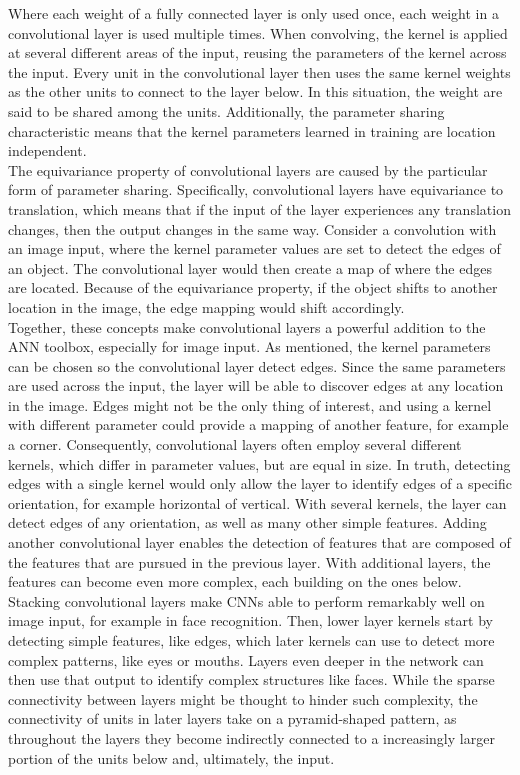 \noindent Where each weight of a fully connected layer is only used once, each weight in a convolutional layer is used multiple times. When convolving, the kernel is applied at several different areas of the input, reusing the parameters of the kernel across the input. Every unit in the convolutional layer then uses the same kernel weights as the other units to connect to the layer below. In this situation, the weight are said to be shared among the units. Additionally, the parameter sharing characteristic means that the kernel parameters learned in training are location independent. \\

\noindent The equivariance property of convolutional layers are caused by the particular form of parameter sharing. Specifically, convolutional layers have equivariance to translation, which means that if the input of the layer experiences any translation changes, then the output changes in the same way. Consider a convolution with an image input, where the kernel parameter values are set to detect the edges of an object. The convolutional layer would then create a map of where the edges are located. Because of the equivariance property, if the object shifts to another location in the image, the edge mapping would shift accordingly. \\

\noindent Together, these concepts make convolutional layers a powerful addition to the ANN toolbox, especially for image input. As mentioned, the kernel parameters can be chosen so the convolutional layer detect edges. Since the same parameters are used across the input, the layer will be able to discover edges at any location in the image. Edges might not be the only thing of interest, and using a kernel with different parameter could provide a mapping of another feature, for example a corner. Consequently, convolutional layers often employ several different kernels, which differ in parameter values, but are equal in size. In truth, detecting edges with a single kernel would only allow the layer to identify edges of a specific orientation, for example horizontal of vertical. With several kernels, the layer can detect edges of any orientation, as well as many other simple features. Adding another convolutional layer enables the detection of features that are composed of the features that are pursued in the previous layer. With additional layers, the features can become even more complex, each building on the ones below. Stacking convolutional layers make CNNs able to perform remarkably well on image input, for example in face recognition. Then, lower layer kernels start by detecting simple features, like edges, which later kernels can use to detect more complex patterns, like eyes or mouths. Layers even deeper in the network can then use that output to identify complex structures like faces. While the sparse connectivity between layers might be thought to hinder such complexity, the connectivity of units in later layers take on a pyramid-shaped pattern, as throughout the layers they become indirectly connected to a increasingly larger portion of the units below and, ultimately, the input.

